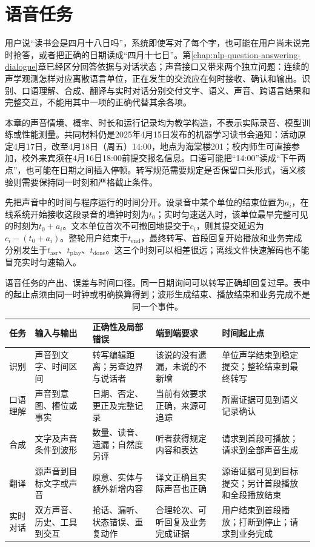 \chapter{语音任务}
\label{chap:nlp-speech-tasks}

用户说“读书会是四月十八日吗”，系统即使写对了每个字，也可能在用户尚未说完时抢答，或者把正确的日期读成“四月十七日”。第\ref{chap:nlp-question-answering-dialogue}章已经区分回答依据与对话状态；声音接口又带来两个独立问题：连续的声学观测怎样对应离散语言单位，正在发生的交流应在何时接收、确认和输出。识别、口语理解、合成、翻译与实时对话分别交付文字、语义、声音、跨语言结果和完整交互，不能用其中一项的正确代替其余各项。

本章的声音情境、概率、时长和运行记录均为教学构造，不表示实际录音、模型训练或性能测量。共同材料仍是2025年4月15日发布的机器学习读书会通知：活动原定4月17日，改至4月18日（周五）14:00，地点为海棠楼201；校内师生可直接参加，校外来宾须在4月16日18:00前提交报名信息。口语可能把“14:00”读成“下午两点”，也可能在日期之间插入停顿。转写规范需要规定是否保留口头形式，语义核验则需要保持同一时刻和严格截止条件。

先把声音中的时间与程序运行的时间分开。设录音中某个单位的结束位置为$a_i$，在线系统开始接收这段录音的墙钟时刻为$t_0$；实时匀速送入时，该单位最早完整可见的时刻为$t_0+a_i$。文本单位首次不可撤回地提交于$c_i$，则其提交延迟为$c_i-(t_0+a_i)$。整轮用户结束于$t_{\mathrm{end}}$，最终转写、首段回复开始播放和业务完成分别发生于$t_{\mathrm{asr}}$、$t_{\mathrm{play}}$、$t_{\mathrm{done}}$。这三个时刻可以相差很远；离线文件快速解码也不能冒充实时匀速输入。

\begin{table}[htbp]
  \centering
  \begin{tabularx}{\linewidth}{@{}p{15mm}p{28mm}X X p{36mm}@{}}
    \toprule
    任务 & 输入与输出 & 正确性及局部错误 & 端到端要求 & 时间起止点\\
    \midrule
    识别 & 声音到文字、时间区间 & 转写编辑距离；另查边界与说话者 & 该说的没有遗漏，未说的不新增 & 单位声学结束到稳定提交；整轮结束到最终转写\\
    口语理解 & 声音到意图、槽位或事实 & 日期、否定、更正及完整记录 & 当前有效要求正确，来源可追踪 & 所需证据可见到语义记录确认\\
    合成 & 文字及声音条件到波形 & 数量、读音、遗漏；自然度另评 & 听者获得规定内容和表达 & 请求到首段可播放；请求到全部声音生成\\
    翻译 & 源声音到目标文字或声音 & 原意、实体与额外新增内容 & 译文正确且实际声音也正确 & 源语证据可见到目标提交；另计首段播放和全段播放结束\\
    实时对话 & 双方声音、历史、工具到交互 & 抢话、漏听、状态错误、重复动作 & 合理轮次、可听回复及业务完成证据 & 用户结束到首段播放；打断到停止；请求到业务完成\\
    \bottomrule
  \end{tabularx}
  \caption{语音任务的产出、误差与时间口径。同一日期询问可以转写正确却回复过早。表中的起止点须由同一时钟或明确换算得到；波形生成结束、播放结束和业务完成不是同一个事件。}
  \label{tab:nlp-speech-contracts}
\end{table}
\FloatBarrier


